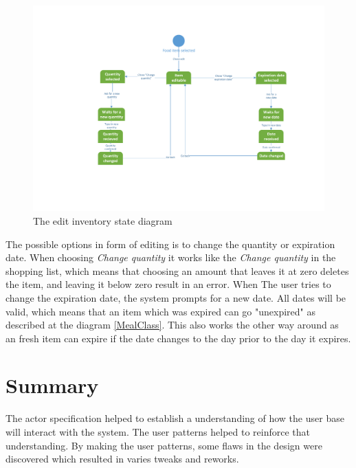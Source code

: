 \begin{figure}[H]
	\centering
	\includegraphics[width=1.0\textwidth]{ApplicationDomain/spEditInventory.pdf} 
	\caption{The edit inventory state diagram}
	\label{spEditInventory}
\end{figure}
The possible options in form of editing is to change the quantity or expiration date. 
When choosing \textit{Change quantity} it works like the \textit{Change quantity} in the shopping list, which means that choosing an amount that leaves it at zero deletes the item, and leaving it below zero result in an error. When The user tries to change the expiration date, the system prompts for a new date. All dates will be valid, which means that an item which was expired can go "unexpired" as described at the diagram \cref{MealClass}. This also works the other way around as an fresh item can expire if the date changes to the day prior to the day it expires.


\section*{Summary}
The actor specification helped to establish a understanding of how the user base will interact with the system. The user patterns helped to reinforce that understanding. By making the user patterns, some flaws in the design were discovered which resulted in varies tweaks and reworks.